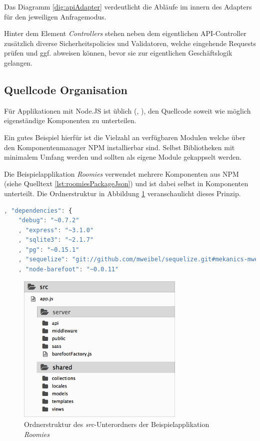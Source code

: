 Das Diagramm \ref{dig:apiAdapter} verdeutlicht die Abläufe im innern des Adapters für den jeweiligen Anfragemodus.

Hinter dem Element \emph{Controllers} stehen neben dem eigentlichen API-Controller zusätzlich diverse Sicherheitspolicies und Validatoren, welche eingehende Requests prüfen und ggf. abweisen können, bevor sie zur eigentlichen Geschäftslogik gelangen.



\newpage

\subsection{Quellcode Organisation}
Für Applikationen mit Node.JS ist üblich (\cite{TJH_ComponentStructure}, \cite{IZS_ComponentStructure}), den Quellcode soweit wie möglich eigenständige Komponenten zu unterteilen.

Ein gutes Beispiel hierfür ist die Vielzahl an verfügbaren Modulen welche über den Komponentenmanager NPM \cite{NPM} installierbar sind. Selbst Bibliotheken mit minimalem Umfang werden und sollten als eigene Module gekappselt werden.

Die Beispielapplikation \emph{Roomies} verwendet mehrere Komponenten aus NPM (siehe Quelltext \ref{lst:roomiesPackageJson}) und ist dabei selbst in Komponenten unterteilt. Die Ordnerstruktur in Abbildung \ref{fig:roomiesFolderStructure} veranschaulicht dieses Prinzip.

\begin{lstlisting}[language=JavaScript, firstnumber=9, caption={Auszug der verwendeten NPM Komponenten \cite{RoomiesPackageJson}}, label={lst:roomiesPackageJson}, float=ht!]
, "dependencies": {
	"debug": "~0.7.2"
	, "express": "~3.1.0"
	, "sqlite3": "~2.1.7"
	, "pg": "~0.15.1"
	, "sequelize": "git://github.com/mweibel/sequelize.git#mekanics-mweibel-fix"
	, "node-barefoot": "~0.0.11"
\end{lstlisting}

\begin{figure}[H]
	\centering
	\includegraphics[width=8cm]{content/sad/images/folder-structure.png}
	\caption{Ordnerstruktur des \emph{src}-Unterordners der Beispielapplikation \emph{Roomies}}
	\label{fig:roomiesFolderStructure}
\end{figure}

